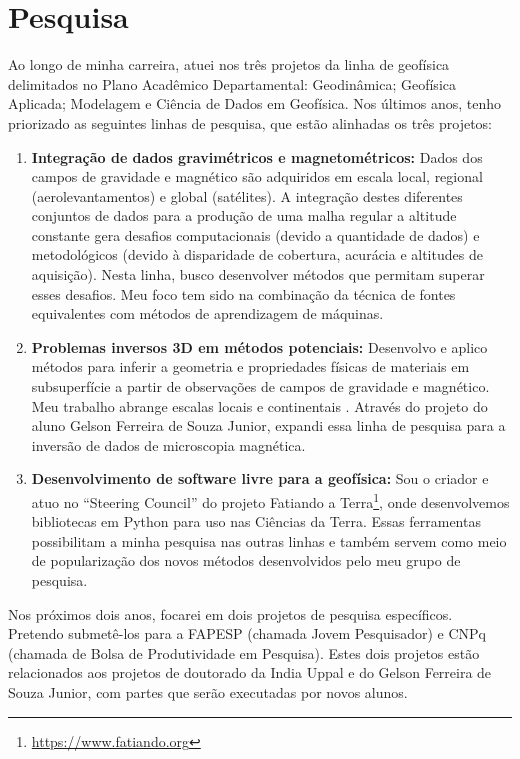 \documentclass[12pt,a4paper,oneside]{book}
\begin{document}
\chapter{Pesquisa}

Ao longo de minha carreira, atuei nos três projetos da linha de geofísica
delimitados no Plano Acadêmico Departamental: Geodinâmica; Geofísica Aplicada;
Modelagem e Ciência de Dados em Geofísica.
Nos últimos anos, tenho priorizado as seguintes linhas de pesquisa, que  estão
alinhadas os três projetos:

\begin{enumerate}
  \item \textbf{Integração de dados gravimétricos e magnetométricos:}
    Dados dos campos de gravidade e magnético são adquiridos em escala local,
    regional (aerolevantamentos) e global (satélites). A integração destes
    diferentes conjuntos de dados para a produção de uma malha regular a
    altitude constante gera desafios computacionais (devido a quantidade de dados) e metodológicos (devido à disparidade de cobertura, acurácia e altitudes
    de aquisição). Nesta linha, busco desenvolver métodos que permitam superar
    esses desafios. Meu foco tem sido na combinação da técnica de fontes
    equivalentes com métodos de aprendizagem de máquinas.
  \item \textbf{Problemas inversos 3D em métodos potenciais:}
    Desenvolvo e aplico métodos para inferir a geometria e propriedades físicas
    de materiais em subsuperfície a partir de observações de campos de
    gravidade e magnético. Meu trabalho abrange escalas locais
    \citep{Uieda2012,Carlos2014} e continentais \citep{Uieda2017,Zhao2019}.
    Através do projeto do aluno Gelson Ferreira de Souza Junior, expandi essa
    linha de pesquisa para a inversão de dados de microscopia magnética.
  \item \textbf{Desenvolvimento de software livre para a geofísica:}
    Sou o criador e atuo no ``Steering Council'' do projeto Fatiando a
    Terra\footnote{\url{https://www.fatiando.org}}, onde desenvolvemos
    bibliotecas em Python para uso nas Ciências da Terra. Essas ferramentas
    possibilitam a minha pesquisa nas outras linhas e também servem como meio
    de popularização dos novos métodos desenvolvidos pelo meu grupo de
    pesquisa.
\end{enumerate}

Nos próximos dois anos, focarei em dois projetos de pesquisa específicos.
Pretendo submetê-los para a FAPESP (chamada Jovem Pesquisador) e CNPq (chamada
de Bolsa de Produtividade em Pesquisa). Estes dois projetos estão relacionados
aos projetos de doutorado da India Uppal e do Gelson Ferreira de Souza Junior,
com partes que serão executadas por novos alunos.
\end{document}
